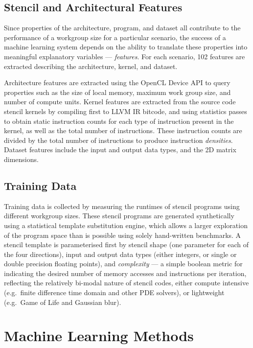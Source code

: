 \documentclass[preprint,nonatbib,10pt,nocopyrightspace]{sigplanconf}
\begin{document}
  \subsection{Stencil and Architectural Features}

  Since properties of the architecture, program, and dataset all contribute to the
  performance of a workgroup size for a particular scenario, the success of a
  machine learning system depends on the ability to translate these properties
  into meaningful explanatory variables --- \emph{features}. For each scenario,
  102 features are extracted describing the architecture, kernel, and dataset.

  Architecture features are extracted using the OpenCL Device API to query
  properties such as the size of local memory, maximum work group size, and number
  of compute units. Kernel features are extracted from the source code stencil
  kernels by compiling first to LLVM IR bitcode, and using statistics passes to
  obtain static instruction counts for each type of instruction present in the
  kernel, as well as the total number of instructions. These instruction counts
  are divided by the total number of instructions to produce instruction
  \emph{densities}. Dataset features include the input and output data
  types, and the 2D matrix dimensions.


  \subsection{Training Data}\label{subsec:training}

  Training data is collected by measuring the runtimes of stencil programs using
  different workgroup sizes. These stencil programs are generated synthetically
  using a statistical template substitution engine, which allows a larger
  exploration of the program space than is possible using solely hand-written
  benchmarks. A stencil template is parameterised first by stencil shape (one
  parameter for each of the four directions), input and output data types (either
  integers, or single or double precision floating points), and \emph{complexity}
  --- a simple boolean metric for indicating the desired number of memory accesses
  and instructions per iteration, reflecting the relatively bi-modal nature of
  stencil codes, either compute intensive (e.g.\ finite difference time domain and
  other PDE solvers), or lightweight (e.g.\ Game of Life and Gaussian blur).


  \section{Machine Learning Methods}\label{sec:ml}
\end{document}
